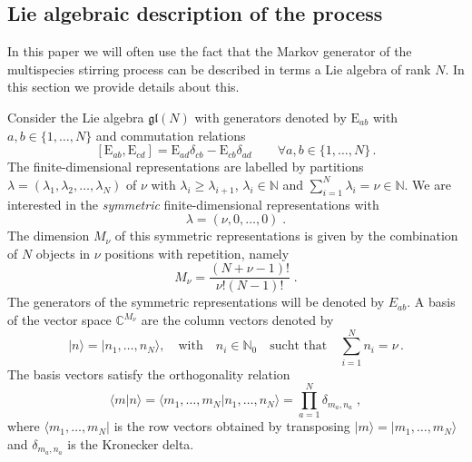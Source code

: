 \documentclass[10pt]{article}
\numberwithin{equation}{section}
\numberwithin{equation}{subsection}
\newcommand{\co}{\;,}
\newcommand{\dt}{\;.}
\newcommand{\EE}{\mathrm{E}}
\newcommand{\twoj}{\nu}
\begin{document}
\subsection{Lie algebraic description of the process}

In this paper we will often use the fact that the Markov generator of the multispecies stirring process can be described in terms a Lie algebra of rank $N$.
In this section we provide details about this.

Consider the Lie algebra $\mathfrak{gl}(N)$ with generators denoted by $\EE_{ab}$ with $a,b\in \{1,\ldots,N\}$ and commutation relations
\begin{equation}\label{eq:comgl}
\left[\EE_{ab},\EE_{cd}\right]=\EE_{ad}\delta_{cb}-\EE_{cb}\delta_{ad}\qquad \forall a,b\in \{1,\ldots,N\}\,.
\end{equation}
The finite-dimensional representations are labelled by partitions $\lambda=(\lambda_1,\lambda_2,\ldots,\lambda_N)$ of $\nu$ with  $\lambda_i\geq \lambda_{i+1}$,  $\lambda_i\in \mathbb{N}$ and $\sum_{i=1}^N \lambda_i = \nu\in\mathbb{N}$.  
We are interested in the {\em symmetric} finite-dimensional representations with 
\begin{equation}\label{eq:dynkin}
    \lambda=(\twoj,0,\ldots,0) \;.
\end{equation} 
The dimension $M_\twoj$ of this symmetric representations is given by the combination of $N$ objects in $\twoj$ positions with repetition, namely
\begin{equation}
	M_\twoj= \frac{(N+\twoj-1)!}{\twoj  !(N-1)!}\dt
\end{equation} 
The generators of the symmetric representations will be denoted by $E_{ab}$.
A basis of the vector space $\mathbb{C}^{M_\twoj}$ are the column vectors denoted by
\begin{equation}
  |n\rangle=  |n_{1},\ldots,n_{N}\rangle,\quad \text{with}\quad n_{i}\in\mathbb{N}_{0}\quad \text{sucht that}\quad \sum_{i=1}^{N}n_{i}=\nu\,.
\end{equation}
The basis vectors satisfy the orthogonality relation
\begin{equation}\label{ortho}
   \langle m|n \rangle =\langle m_{1},\ldots,m_{N}|n_{1},\ldots,n_{N}\rangle=\prod_{a=1}^{N}\delta_{m_{a},n_{a}}\co
\end{equation}
where  $ \langle m_{1},\ldots,m_{N}|$ is the row vectors obtained by transposing $|m\rangle=|m_{1},\ldots,m_{N}\rangle$ and $\delta_{m_{a},n_{a}}$ is the Kronecker delta. 
\end{document}
